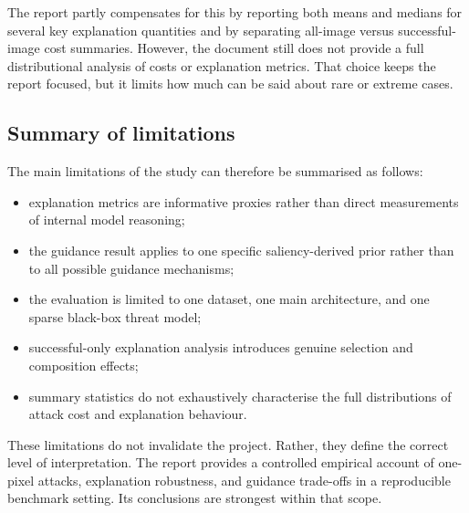 The report partly compensates for this by reporting both means and medians for several key explanation quantities and by separating all-image versus successful-image cost summaries.
However, the document still does not provide a full distributional analysis of costs or explanation metrics.
That choice keeps the report focused, but it limits how much can be said about rare or extreme cases.

\subsection{Summary of limitations}
The main limitations of the study can therefore be summarised as follows:
\begin{itemize}
  \item explanation metrics are informative proxies rather than direct measurements of internal model reasoning;
  \item the guidance result applies to one specific saliency-derived prior rather than to all possible guidance mechanisms;
  \item the evaluation is limited to one dataset, one main architecture, and one sparse black-box threat model;
  \item successful-only explanation analysis introduces genuine selection and composition effects;
  \item summary statistics do not exhaustively characterise the full distributions of attack cost and explanation behaviour.
\end{itemize}

These limitations do not invalidate the project.
Rather, they define the correct level of interpretation.
The report provides a controlled empirical account of one-pixel attacks, explanation robustness, and guidance trade-offs in a reproducible benchmark setting.
Its conclusions are strongest within that scope.
